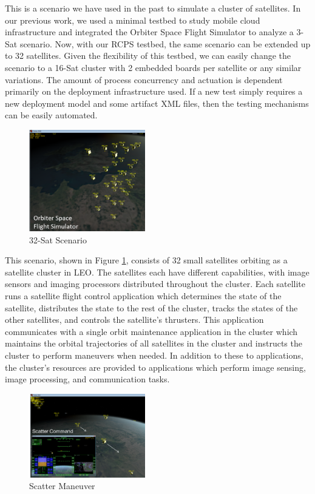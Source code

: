 This is a scenario we have used in the past \cite{RSP-2014} to simulate a cluster of satellites. In our previous work, we used a minimal testbed to study mobile cloud infrastructure and integrated the Orbiter Space Flight Simulator \cite{Orbiter} to analyze a 3-Sat scenario. Now, with our RCPS testbed, the same scenario can be extended up to 32 satellites. Given the flexibility of this testbed, we can easily change the scenario to a 16-Sat cluster with 2 embedded boards per satellite or any similar variations. The amount of process concurrency and actuation is dependent primarily on the deployment infrastructure used. If a new test simply requires a new deployment model and some artifact XML files, then the testing mechanisms can be easily automated. 

\begin{figure}[h]
	\centering
	\includegraphics[width=0.45\textwidth]{figs/orbiter-1.png}
	\caption{32-Sat Scenario}
	\label{fig:orbiter}
\end{figure} 

This scenario, shown in Figure \ref{fig:orbiter}, consists of 32 small satellites orbiting as a satellite cluster in LEO.  The satellites each have different capabilities, with image sensors and imaging processors distributed throughout the cluster.  Each satellite runs a satellite flight control application which determines the state of the satellite, distributes the state to the rest of the cluster, tracks the states of the other satellites, and controls the satellite's thrusters.  This application communicates with a single orbit maintenance application in the cluster which maintains the orbital trajectories of all satellites in the cluster and instructs the cluster to perform maneuvers when needed.  In addition to these to applications, the cluster's resources are provided to applications which perform image sensing, image processing, and communication tasks.  

\begin{figure}[h]
	\centering
	\includegraphics[width=0.45\textwidth]{figs/orbiter-2.png}
	\caption{Scatter Maneuver}
	\label{fig:orbiter_2}
\end{figure}

